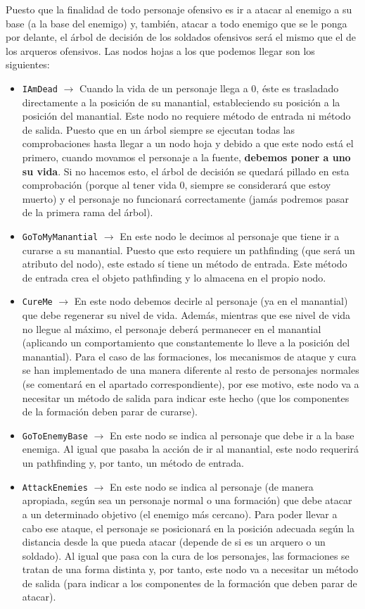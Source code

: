 Puesto que la finalidad de todo personaje ofensivo es ir a atacar al enemigo a su base (a la base del enemigo) y, también, atacar a todo enemigo que se le ponga por delante, el árbol de decisión de los soldados ofensivos será el mismo que el de los arqueros ofensivos. Las nodos hojas a los que podemos llegar son los siguientes:
\begin{itemize}
	\item \texttt{IAmDead} $\rightarrow$ Cuando la vida de un personaje llega a 0, éste es trasladado directamente a la posición de su manantial, estableciendo su posición a la posición del manantial. Este nodo no requiere método de entrada ni método de salida. Puesto que en un árbol siempre se ejecutan todas las comprobaciones hasta llegar a un nodo hoja y debido a que este nodo está el primero, cuando movamos el personaje a la fuente, \textbf{debemos poner a uno su vida}. Si no hacemos esto, el árbol de decisión se quedará pillado en esta comprobación (porque al tener vida 0, siempre se considerará que estoy muerto) y el personaje no funcionará correctamente (jamás podremos pasar de la primera rama del árbol).
	\item \texttt{GoToMyManantial} $\rightarrow$ En este nodo le decimos al personaje que tiene ir a curarse a su manantial. Puesto que esto requiere un pathfinding (que será un atributo del nodo), este estado sí tiene un método de entrada. Este método de entrada crea el objeto pathfinding y lo almacena en el propio nodo.
	\item \texttt{CureMe} $\rightarrow$ En este nodo debemos decirle al personaje (ya en el manantial) que debe regenerar su nivel de vida. Además, mientras que ese nivel de vida no llegue al máximo, el personaje deberá permanecer en el manantial (aplicando un comportamiento que constantemente lo lleve a la posición del manantial). Para el caso de las formaciones, los mecanismos de ataque y cura se han implementado de una manera diferente al resto de personajes normales (se comentará en el apartado correspondiente), por ese motivo, este nodo va a necesitar un método de salida para indicar este hecho (que los componentes de la formación deben parar de curarse).
	\item \texttt{GoToEnemyBase} $\rightarrow$ En este nodo se indica al personaje que debe ir a la base enemiga. Al igual que pasaba la acción de ir al manantial, este nodo requerirá un pathfinding y, por tanto, un método de entrada.
	\item \texttt{AttackEnemies} $\rightarrow$ En este nodo se indica al personaje (de manera apropiada, según sea un personaje normal o una formación) que debe atacar a un determinado objetivo (el enemigo más cercano). Para poder llevar a cabo ese ataque, el personaje se posicionará en la posición adecuada según la distancia desde la que pueda atacar (depende de si es un arquero o un soldado). Al igual que pasa con la cura de los personajes, las formaciones se tratan de una forma distinta y, por tanto, este nodo va a necesitar un método de salida (para indicar a los componentes de la formación que deben parar de atacar).

\end{itemize}
